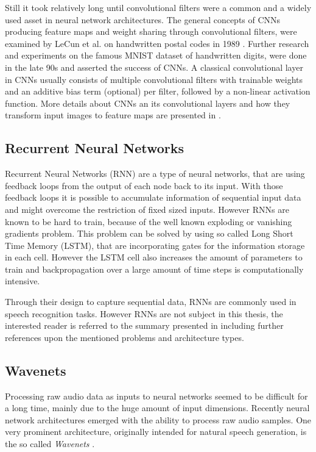 Still it took relatively long until convolutional filters were a common and a widely used asset in neural network architectures.
The general concepts of CNNs producing feature maps and weight sharing through convolutional filters, were examined by LeCun et al. on handwritten postal codes in 1989 \cite{LeCun1989_Generalization}.
Further research and experiments on the famous MNIST dataset of handwritten digits, were done in the late 90s \cite{LeCun1998} and asserted the success of CNNs.
A classical convolutional layer in CNNs usually consists of multiple convolutional filters with trainable weights and an additive bias term (optional) per filter, followed by a non-linear activation function.
More details about CNNs an its convolutional layers and how they transform input images to feature maps are presented in .



\subsection{Recurrent Neural Networks}\label{sec:prev_nn_rnn}
Recurrent Neural Networks (RNN) are a type of neural networks, that are using feedback loops from the output of each node back to its input.
With those feedback loops it is possible to accumulate information of sequential input data and might overcome the restriction of fixed sized inputs.
However RNNs are known to be hard to train, because of the well known exploding or vanishing gradients problem.
This problem can be solved by using so called Long Short Time Memory (LSTM), that are incorporating gates for the information storage in each cell. 
However the LSTM cell also increases the amount of parameters to train and backpropagation over a large amount of time steps is computationally intensive.

Through their design to capture sequential data, RNNs are commonly used in speech recognition tasks.
However RNNs are not subject in this thesis, the interested reader is referred to the summary presented in \cite{Staudenmeyer2019} including further references upon the mentioned problems and architecture types.



\subsection{Wavenets}\label{sec:prev_nn_wavenet}
Processing raw audio data as inputs to neural networks seemed to be difficult for a long time, mainly due to the huge amount of input dimensions.
Recently neural network architectures emerged with the ability to process raw audio samples.
One very prominent architecture, originally intended for natural speech generation, is the so called \emph{Wavenets} \cite{Oord2016}.

